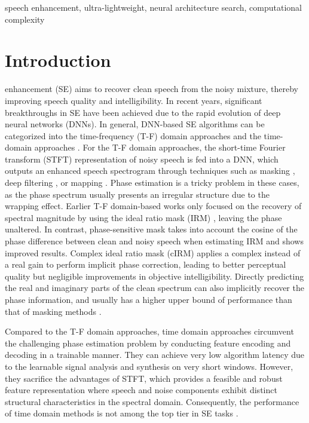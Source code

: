 \documentclass[journal]{IEEEtran}
\newcommand{\rev}[1]{#1}
\begin{document}
\begin{IEEEkeywords}
speech enhancement, ultra-lightweight, neural architecture search, computational complexity
\end{IEEEkeywords}

\section{Introduction}
 enhancement (SE) aims to recover clean speech from the noisy mixture, thereby improving speech quality and intelligibility. In recent years, significant breakthroughs in SE have been achieved due to the rapid evolution of deep neural networks (DNNs). In general, DNN-based SE algorithms can be categorized into the time-frequency (T-F) domain approaches \cite{CRN, DCCRN, DPCRN, BSRNN, DeepFilterNetV2, TF-GridNet} and the time-domain approaches \cite{TCNN, ConvTasNet, DPRNN, TSTNN}. For the T-F domain approaches, the short-time Fourier transform (STFT) representation of noisy speech is fed into a DNN, which outputs an enhanced speech spectrogram through techniques such as masking \cite{CRN, DCCRN, DPCRN, BSRNN}, deep filtering \cite{DeepFilterNetV2, Deep_Filtering}, or mapping \cite{TF-GridNet}. Phase estimation is a tricky problem in these cases, as the phase spectrum usually presents an irregular structure due to the wrapping effect. Earlier T-F domain-based works only \rev{focused} on the recovery of spectral magnitude by using the ideal ratio mask (IRM) \cite{IRM}, leaving the phase unaltered. In contrast, phase-sensitive mask \cite{Phase-sensitive} takes into account the cosine of the phase difference between clean and noisy speech when estimating IRM and shows improved results. Complex ideal ratio mask (cIRM) \cite{CRM} applies a complex instead of a real gain to perform implicit phase correction, leading to better perceptual quality but negligible improvements in objective intelligibility. Directly predicting the real and imaginary parts of the clean spectrum can also implicitly recover the phase information, and usually has a higher upper bound of performance than that of masking methods \cite{Complex_spectral_mapping, TF-GridNet}.

Compared to the T-F domain approaches, time domain approaches circumvent the challenging phase estimation problem by conducting feature encoding and decoding in a trainable manner. They can achieve very low algorithm latency due to the learnable signal analysis and synthesis on very short windows. However, they sacrifice the advantages of STFT, which provides a feasible and robust feature representation where speech and noise components exhibit distinct structural characteristics in the spectral domain. Consequently, the performance of time domain methods is not among the top tier in SE tasks \cite{PHASEN}.
\end{document}
